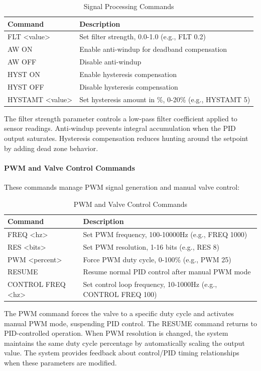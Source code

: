 \documentclass[12pt,a4paper]{article}
\begin{document}
\begin{table}[H]
\centering
\begin{tabular}{@{}ll@{}}
\toprule
\textbf{Command} & \textbf{Description} \\
\midrule
FLT <value> & Set filter strength, 0.0-1.0 (e.g., FLT 0.2) \\
AW ON & Enable anti-windup for deadband compensation \\
AW OFF & Disable anti-windup \\
HYST ON & Enable hysteresis compensation \\
HYST OFF & Disable hysteresis compensation \\
HYSTAMT <value> & Set hysteresis amount in \%, 0-20\% (e.g., HYSTAMT 5) \\
\bottomrule
\end{tabular}
\caption{Signal Processing Commands}
\end{table}

The filter strength parameter controls a low-pass filter coefficient applied to sensor readings. Anti-windup prevents integral accumulation when the PID output saturates. Hysteresis compensation reduces hunting around the setpoint by adding dead zone behavior.

\paragraph{PWM and Valve Control Commands}
These commands manage PWM signal generation and manual valve control:

\begin{table}[H]
\centering
\begin{tabular}{@{}ll@{}}
\toprule
\textbf{Command} & \textbf{Description} \\
\midrule
FREQ <hz> & Set PWM frequency, 100-10000Hz (e.g., FREQ 1000) \\
RES <bits> & Set PWM resolution, 1-16 bits (e.g., RES 8) \\
PWM <percent> & Force PWM duty cycle, 0-100\% (e.g., PWM 25) \\
RESUME & Resume normal PID control after manual PWM mode \\
CONTROL FREQ <hz> & Set control loop frequency, 10-1000Hz (e.g., CONTROL FREQ 100) \\
\bottomrule
\end{tabular}
\caption{PWM and Valve Control Commands}
\end{table}

The PWM command forces the valve to a specific duty cycle and activates manual PWM mode, suspending PID control. The RESUME command returns to PID-controlled operation. When PWM resolution is changed, the system maintains the same duty cycle percentage by automatically scaling the output value. The system provides feedback about control/PID timing relationships when these parameters are modified.
\end{document}

